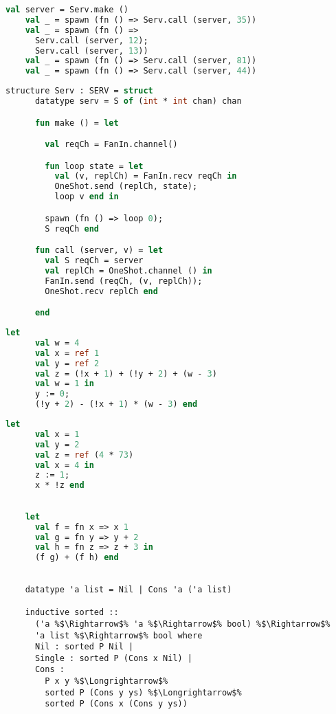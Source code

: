 \documentclass{article}
\begin{document}
  \begin{lstlisting}[language=ML, style=codestyle1]
    val server = Serv.make ()
    val _ = spawn (fn () => Serv.call (server, 35))
    val _ = spawn (fn () => 
      Serv.call (server, 12); 
      Serv.call (server, 13))
    val _ = spawn (fn () => Serv.call (server, 81))
    val _ = spawn (fn () => Serv.call (server, 44))
    \end{lstlisting}

  \begin{lstlisting}[language=ML, style=codestyle1]
    structure Serv : SERV = struct 
      datatype serv = S of (int * int chan) chan 

      fun make () = let 

        val reqCh = FanIn.channel()

        fun loop state = let
          val (v, replCh) = FanIn.recv reqCh in 
          OneShot.send (replCh, state);
          loop v end in

        spawn (fn () => loop 0);
        S reqCh end 

      fun call (server, v) = let 
        val S reqCh = server
        val replCh = OneShot.channel () in 
        FanIn.send (reqCh, (v, replCh));
        OneShot.recv replCh end

      end
    \end{lstlisting}

  \begin{lstlisting}[language=ML, style=codestyle1]
    let
      val w = 4
      val x = ref 1
      val y = ref 2
      val z = (!x + 1) + (!y + 2) + (w - 3)
      val w = 1 in
      y := 0;
      (!y + 2) - (!x + 1) * (w - 3) end
    \end{lstlisting}

  \begin{lstlisting}[language=ML, style=codestyle1]
    let 
      val x = 1  
      val y = 2
      val z = ref (4 * 73)
      val x = 4 in 
      z := 1; 
      x * !z end
    \end{lstlisting}

  \begin{lstlisting}[language=ML, style=codestyle1]

    let 
      val f = fn x => x 1
      val g = fn y => y + 2
      val h = fn z => z + 3 in 
      (f g) + (f h) end

  \end{lstlisting}


  \begin{lstlisting}[style=codestyle1, escapechar=\%]

    datatype 'a list = Nil | Cons 'a ('a list)

    inductive sorted ::
      ('a %$\Rightarrow$% 'a %$\Rightarrow$% bool) %$\Rightarrow$%
      'a list %$\Rightarrow$% bool where
      Nil : sorted P Nil |
      Single : sorted P (Cons x Nil) |
      Cons :
        P x y %$\Longrightarrow$%
        sorted P (Cons y ys) %$\Longrightarrow$%
        sorted P (Cons x (Cons y ys))
    \end{lstlisting}
\end{document}
